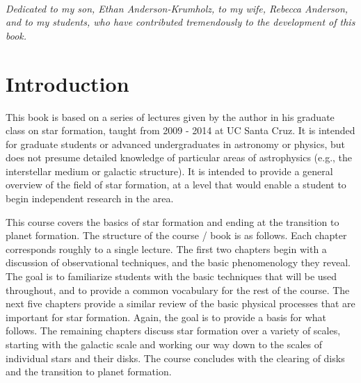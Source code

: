 \documentclass{tex/tufte-book} %
\begin{document}


\cleardoublepage
~\vfill
\begin{doublespace}
\noindent\fontsize{18}{22}\selectfont\itshape
\nohyphenation
Dedicated to my son, Ethan Anderson-Krumholz, to my wife, Rebecca Anderson, and to my students, who have contributed tremendously to the development of this book.
\end{doublespace}
\vfill
\vfill


\cleardoublepage
\chapter*{Introduction} %

This book is based on a series of lectures given by the author in his graduate class on star formation, taught from 2009 - 2014 at UC Santa Cruz. It is intended for graduate students or advanced undergraduates in astronomy or physics, but does not presume detailed knowledge of particular areas of astrophysics (e.g., the interstellar medium or galactic structure). It is intended to provide a general overview of the field of star formation, at a level that would enable a student to begin independent research in the area.

This course covers the basics of star formation and ending at the transition to planet formation. The structure of the course / book is as follows. Each chapter corresponds roughly to a single lecture. The first two chapters begin with a discussion of observational techniques, and the basic phenomenology they reveal. The goal is to familiarize students with the basic techniques that will be used throughout, and to provide a common vocabulary for the rest of the course. The next five chapters provide a similar review of the basic physical processes that are important for star formation. Again, the goal is to provide a basis for what follows. The remaining chapters discuss star formation over a variety of scales, starting with the galactic scale and working our way down to the scales of individual stars and their disks. The course concludes with the clearing of disks and the transition to planet formation.
\end{document}
